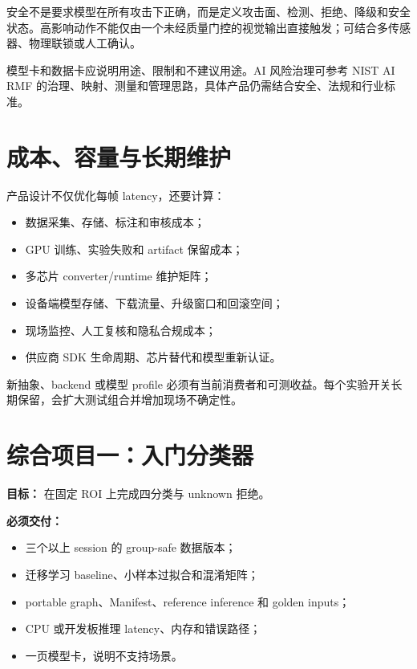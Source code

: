 安全不是要求模型在所有攻击下正确，而是定义攻击面、检测、拒绝、降级和安全状态。高影响动作不能仅由一个未经质量门控的视觉输出直接触发；可结合多传感器、物理联锁或人工确认。

模型卡和数据卡应说明用途、限制和不建议用途\cite{model-cards,datasheets-for-datasets}。AI 风险治理可参考 NIST AI RMF 的治理、映射、测量和管理思路\cite{nist-ai-rmf}，具体产品仍需结合安全、法规和行业标准。

\section{成本、容量与长期维护}

产品设计不仅优化每帧 latency，还要计算：

\begin{itemize}
  \item 数据采集、存储、标注和审核成本；
  \item GPU 训练、实验失败和 artifact 保留成本；
  \item 多芯片 converter/runtime 维护矩阵；
  \item 设备端模型存储、下载流量、升级窗口和回滚空间；
  \item 现场监控、人工复核和隐私合规成本；
  \item 供应商 SDK 生命周期、芯片替代和模型重新认证。
\end{itemize}

新抽象、backend 或模型 profile 必须有当前消费者和可测收益。每个实验开关长期保留，会扩大测试组合并增加现场不确定性。

\section{综合项目一：入门分类器}

\textbf{目标：} 在固定 ROI 上完成四分类与 unknown 拒绝。

\textbf{必须交付：}

\begin{itemize}
  \item 三个以上 session 的 group-safe 数据版本；
  \item 迁移学习 baseline、小样本过拟合和混淆矩阵；
  \item portable graph、Manifest、reference inference 和 golden inputs；
  \item CPU 或开发板推理 latency、内存和错误路径；
  \item 一页模型卡，说明不支持场景。
\end{itemize}


